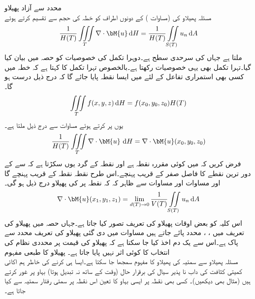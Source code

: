 \quad محدد سے آزاد پھیلاو\\
مسئلہ پھیلاو کی (مساوات ) کے دونوں اطراف کو خطہ  کی حجم  سے تقسیم کرتے ہوئے
\begin{align}\label{مساوات_خطی_تکمل_پھیلاو_مثال_الف}
\frac{1}{H(T)}\iiint\limits_T \nabla \cdot \bM{u}\dif H=\frac{1}{H(T)}\iint\limits_{S(T)}u_n \dif A
\end{align}
ملتا ہے جہاں  کی سرحدی سطح  ہے۔دوہرا تکمل کی خصوصیات کو حصہ  میں بیان کیا گیا۔تہرا تکمل بھی یہی خصوصیات رکھتا ہے۔بالخصوص تہرا تکمل کا  کہتا ہے کہ خطہ  میں کسی بھی استمراری تفاعل   کے لئے  میں ایسا نقطہ  پایا جائے گا کہ درج ذیل درست ہو گا۔
\begin{align*}
\iiint\limits_T f(x,y,z)\dif H=f(x_0,y_0,z_0) H(T)
\end{align*} 
یوں  پر کرتے ہوئے مساوات  سے درج ذیل ملتا ہے۔
\begin{align}\label{مساوات_خطی_تکمل_پھیلاو_مثال_ب}
\frac{1}{H(T)}\iiint\limits_T \nabla \cdot \bM{u}\, \dif H=\nabla \cdot \bM{u}(x_0,y_0,z_0)
\end{align}
فرض کریں کہ  میں  کوئی مقررہ نقطہ ہے اور  نقطہ  کے گرد یوں سکڑتا ہے کہ  سے  کے  دور ترین نقطے کا فاصل  صفر کے قریب پہنچے۔اس طرح نقطہ  نقطہ  کے قریب پہنچے گا اور مساوات  اور مساوات  سے ظاہر کہ کہ نقطہ  پر  کی پھیلاو درج ذیل ہو گی۔
\begin{align}\label{مساوات_خطی_تکمل_پھیلاو_مثال_پ}
\nabla \cdot \bM{u}(x_1,y_1,z_1)=\lim_{d(T)\to 0}\frac{1}{V(T)}\iint\limits_{S(T)}u_n\dif A
\end{align}
اس کلیہ کو بعض اوقات پھیلاو کی تعریف تصور کیا جاتا ہے۔جہاں حصہ  میں پھیلاو کی تعریف میں ، ،  محدد پائے جاتے ہیں مساوات  میں دی گئی پھیلاو کی تعریف محدد سے پاک ہے۔اس سے یک دم اخذ کیا جا سکتا ہے کہ پھیلاو کی قیمت پر محددی نظام کی انتخاب کا کوئی اثر نہیں پایا جاتا ہے۔
\quad پھیلاو کا طبعی مفہوم\\
مسئلہ پھیلاو سے سمتیہ کی پھیلاو کا مفہوم سمجھا جا سکتا ہے۔ایسا ہی کرنے کی خاطر ہم اکائی کمیتی کثافت  کی  داب نا پذیر  سیال کی برقرار حال (وقت کے ساتھ نہ تبدیل ہوتا) بہاو پر غور کرتے ہیں (مثال  بھی دیکھیں)۔ کسی بھی نقطہ  پر ایسی بہاو کا تعین اس نقطہ پر سمتی رفتار سمتیہ  سے کیا جاتا ہے۔


